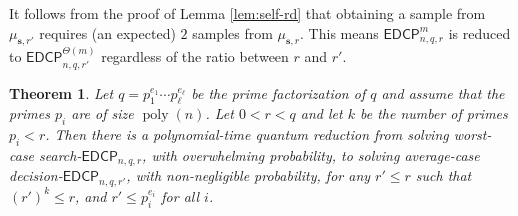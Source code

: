 \documentclass[11pt]{article}
\theoremstyle{plain}
\newtheorem{theorem}{Theorem}
\theoremstyle{definition}
\DeclareMathOperator{\poly}{poly}
\def\edcp{\mathsf{EDCP}}
\begin{document}
It follows from the proof of Lemma \ref{lem:self-rd} that obtaining a sample from $\mu_{\bm{s}, r'}$ requires (an expected) $2$ samples from $\mu_{\bm{s}, r}$. This means $\edcp_{n, q, r}^m$ is reduced to $\edcp_{n, q, r'}^{\Theta(m)}$ regardless of the ratio between $r$ and $r'$.

\begin{theorem}
    \label{thm:old-search-decision}
    Let $q = p_1^{e_1} \cdots p_\ell^{e_\ell}$ be the prime factorization of $q$ and assume that the primes $p_i$ are of size $\poly(n)$. Let $0 < r < q$ and let $k$ be the number of primes $p_i < r$. Then there is a polynomial-time quantum reduction from solving worst-case search-$\edcp_{n, q, r}$, with overwhelming probability, to solving average-case decision-$\edcp_{n, q, r'}$, with non-negligible probability, for any $r' \le r$ such that $(r')^k \le r$, and $r' \le p_i^{e_i}$ for all $i$. 
\end{theorem}
\end{document}

